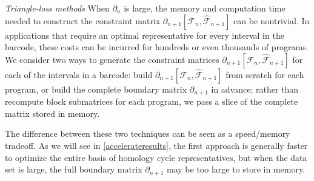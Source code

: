 \emph{Triangle-loss methods}  
When $\partial_n$ is large, the memory and computation time needed to construct the constraint matrix $\partial_{n+1}[\mathcal{F}_n, \hat {\mathcal{F}}_{n+1} ]$ can be nontrivial.  In applications that require an optimal representative for every interval in the barcode, these costs can be incurred for hundreds or even thousands of programs. We consider two ways to generate the constraint matrices $\partial_{n+1}[\mathcal{F}_n, \hat {\mathcal{F}}_{n+1} ]$ for each of the intervals in a barcode: build $\partial_{n+1}[\mathcal{F}_n, \hat {\mathcal{F}}_{n+1} ]$ from scratch for each program, or build the complete boundary matrix $\partial_{n+1}$ in advance; rather than recompute block submatrices for each program, we pass a slice of the complete matrix stored in memory.  

The difference between these two techniques can be seen as a speed/memory tradeoff.  As we will see in \se \ref{accelerateresults}, the first approach is generally faster to optimize the entire basis of homology cycle representatives, but when the data set is large, the full boundary matrix $\partial_{n+1}$ may be too large to store in memory. 







